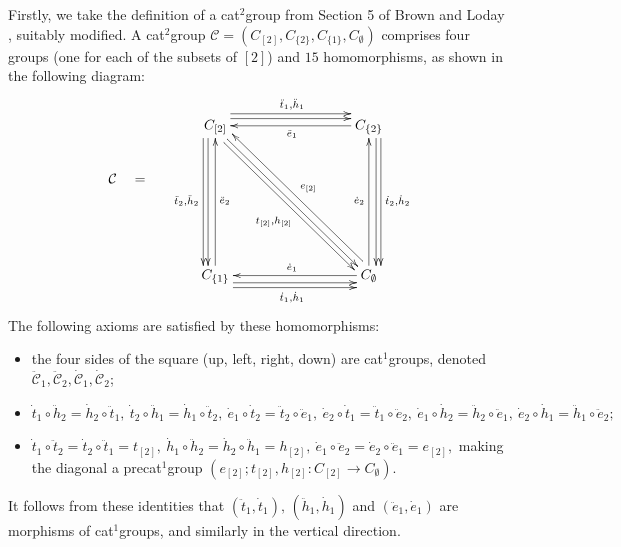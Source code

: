 \documentclass[a4paper,11pt]{report}
\newcommand{\calC}{\mathcal{C}}
\begin{document}
{{ Firstly, we take the definition of a cat$^2$\texttt{}group from Section 5 of Brown and Loday \cite{brow:lod}, suitably modified. A cat$^2$\texttt{}group $\calC = (C_{[2]},C_{\{2\}},C_{\{1\}},C_{\emptyset})$ comprises four groups (one for each of the subsets of $[2]$) and $15$ homomorphisms, as shown in the following diagram: 
\[ \vcenter{\xymatrix{ & C_{[2]} \ar[ddd] <-1.2ex> \ar[ddd]
<-2.0ex>_{\ddot{t}_2,\ddot{h}_2} \ar[rrr] <+1.2ex> \ar[rrr]
<+2.0ex>^{\ddot{t}_1,\ddot{h}_1} \ar[dddrrr] <-0.2ex> \ar[dddrrr]
<-1.0ex>_(0.55){t_{[2]},h_{[2]}} &&& C_{\{2\}} \ar[lll]^{\ddot{e}_1}
\ar[ddd]<+1.2ex> \ar[ddd] <+2.0ex>^{\dot{t}_2,\dot{h}_2} \\ \calC \quad =
\quad & &&& \\ & &&& \\ & C_{\{1\}} \ar[uuu]_{\ddot{e}_2} \ar[rrr] <-1.2ex>
\ar[rrr] <-2.0ex>_{\dot{t}_1,\dot{h}_1} &&& C_{\emptyset} \ar[uuu]^{\dot{e}_2}
\ar[lll]_{\dot{e}_1} \ar[uuulll] <-1.0ex>_{e_{[2]}} \\ }} \]
 The following axioms are satisfied by these homomorphisms: 
\begin{itemize}
\item  the four sides of the square (up, left, right, down) are cat$^1$\texttt{}groups, denoted $\ddot{\calC}_1, \ddot{\calC}_2, \dot{\calC}_1, \dot{\calC}_2$; 
\item  $ \dot{t}_1\circ\ddot{h}_2 = \dot{h}_2\circ\ddot{t}_1, ~
\dot{t}_2\circ\ddot{h}_1 = \dot{h}_1\circ\ddot{t}_2, ~ \dot{e}_1\circ\dot{t}_2
= \ddot{t}_2\circ\ddot{e}_1, ~ \dot{e}_2\circ\dot{t}_1 =
\ddot{t}_1\circ\ddot{e}_2, ~ \dot{e}_1\circ\dot{h}_2 =
\ddot{h}_2\circ\ddot{e}_1, ~ \dot{e}_2\circ\dot{h}_1 =
\ddot{h}_1\circ\ddot{e}_2; $ 
\item  $ \dot{t}_1\circ\ddot{t}_2 = \dot{t}_2\circ\ddot{t}_1 = t_{[2]}, ~
\dot{h}_1\circ\ddot{h}_2 = \dot{h}_2\circ\ddot{h}_1 = h_{[2]}, ~
\dot{e}_1\circ\ddot{e}_2 = \dot{e}_2\circ\ddot{e}_1 = e_{[2]}, $ making the diagonal a pre\texttt{}cat$^1$\texttt{}group $(e_{[2]}; t_{[2]}, h_{[2]} : C_{[2]} \to C_{\emptyset})$. 
\end{itemize}
 It follows from these identities that $(\ddot{t}_1,\dot{t}_1),\,(\ddot{h}_1,\dot{h}_1)$ and $(\ddot{e}_1,\dot{e}_1)$ are morphisms of cat$^1$\texttt{}groups, and similarly in the vertical direction. 

}}
\end{document}
